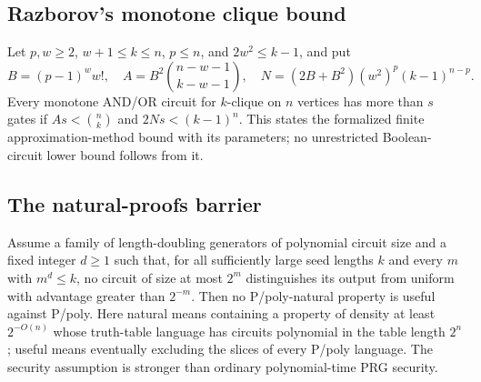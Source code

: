 \begin{result}
\subsection{Razborov's monotone clique bound}
Let $p,w\ge2$, $w+1\le k\le n$, $p\le n$, and $2w^2\le k-1$, and put
\[
B=(p-1)^w w!,\quad
A=B^2\binom{n-w-1}{k-w-1},\quad
N=(2B+B^2)(w^2)^p(k-1)^{n-p}.
\]
Every monotone AND/OR circuit for $k$-clique on $n$ vertices has more than $s$
gates if $As<\binom nk$ and $2Ns<(k-1)^n$. This states the formalized finite
approximation-method bound with its parameters; no unrestricted Boolean-circuit
lower bound follows from it.\citep{Razborov1985}
\end{result}

\begin{result}
\subsection{The natural-proofs barrier}
Assume a family of length-doubling generators of polynomial circuit size and a
fixed integer $d\ge1$ such that, for all sufficiently large seed lengths $k$ and
every $m$ with $m^d\le k$, no circuit of size at most $2^m$ distinguishes its
output from uniform with advantage greater than $2^{-m}$. Then no
P/poly-natural property is useful against P/poly.
Here natural means containing a property of density at least $2^{-O(n)}$ whose
truth-table language has circuits polynomial in the table length $2^n$; useful
means eventually excluding the slices of every P/poly language. The security
assumption is stronger than ordinary polynomial-time PRG security.
\citep{RazborovRudich1997,GGM1986}
\end{result}

